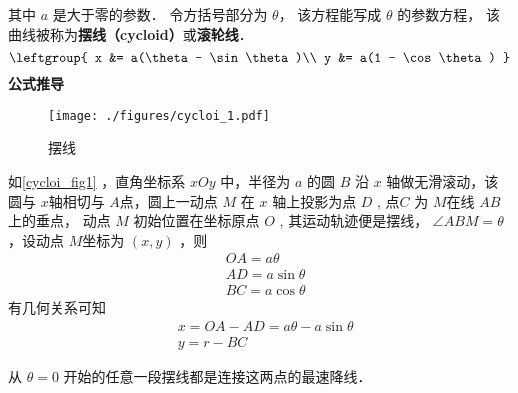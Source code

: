 
\begin{issues}
\issueDraft
\end{issues}

其中 $a$ 是大于零的参数． 令方括号部分为 $\theta$， 该方程能写成 $\theta$ 的参数方程， 该曲线被称为\textbf{摆线（cycloid）}或\textbf{滚轮线}． %
\begin{equation}
\leftgroup{
x &= a(\theta - \sin\theta)\\
y &= a(1 - \cos\theta)
}\end{equation}
\textbf{公式推导}
\begin{figure}[ht]
\centering
\texttt{[image: ./figures/cycloi\_1.pdf]}
\caption{摆线} \label{cycloi_fig1}
\end{figure}
如\autoref{cycloi_fig1} ，直角坐标系 $xOy$ 中，半径为 $a$ 的圆 $B$ 沿 $x$ 轴做无滑滚动，该圆与 $x$轴相切与 $A$点，圆上一动点 $M$ 在 $x$ 轴上投影为点 $D$ , 点$C$ 为 $M$在线 $AB$上的垂点， 动点 $M$ 初始位置在坐标原点 $O$ , 其运动轨迹便是摆线， $\angle ABM=\theta$ ，设动点 $M$坐标为 $(x,y)$ ，则
\begin{equation}
\begin{aligned}
&OA=a\theta \\
&AD=a\sin\theta\\
&BC=a\cos\theta
\end{aligned}
\end{equation}
有几何关系可知
\begin{equation}
\begin{aligned}
&x=OA-AD=a\theta-a\sin\theta\\
&y=r-BC
\end{aligned}
\end{equation}



从 $\theta = 0$ 开始的任意一段摆线都是连接这两点的最速降线． 
